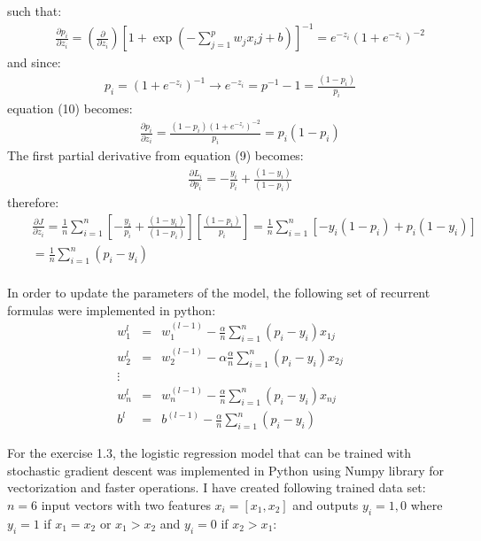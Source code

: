 \documentclass{article}
\begin{document}
such that:
\begin{eqnarray}
&&\frac{\partial{p_i}}{\partial{z_i}} = \left(\frac{\partial{}}{\partial{z_i}}\right)  \left[1+\exp(-\sum_{j=1}^{p} w_{j} x_ij +b )\right]^{-1} = e^{-z_i}(1+e^{-z_i})^{-2} 
\end{eqnarray}
and since:
\begin{eqnarray}
p_i = (1+e^{-z_i}) ^{-1} \rightarrow e^{-z_i} = p^{-1} -1 = \frac{(1-p_i)}{p_i}
\end{eqnarray}
equation (10) becomes:
\begin{eqnarray}
&&\frac{\partial{p_i}}{\partial{z_i}} =  \frac{(1-p_i)(1+e^{-z_i})^{-2} }{p_i}=p_i(1-p_i)
\end{eqnarray}
The first partial derivative from equation (9) becomes:
\begin{eqnarray}
&&\frac{\partial{L_i}}{\partial{p_i}} =  -\frac{y_i}{p_i} + \frac{(1-y_i)}{(1-p_i)}
\end{eqnarray}
therefore:
\begin{eqnarray}
&&\frac{\partial{J}}{\partial{z_i}} =  \frac{1}{n}\sum_{i=1}^{n} \left[-\frac{y_i}{p_i} + \frac{(1-y_i)}{(1-p_i)} \right] \left[  \frac{(1-p_i)}{p_i} \right] = \frac{1}{n}\sum_{i=1}^{n} [ -y_i(1-p_i) + p_i(1-y_i)] \nonumber \\ &&=  \frac{1}{n}\sum_{i=1}^{n}(p_i-y_i) \nonumber \\
\end{eqnarray}

In order to update the parameters of the model, the following set of recurrent formulas were implemented in python:
\begin{eqnarray}
w_1^{l}&=&w_{1}^{(l-1)} -  \frac{\alpha}{n}\sum_{i=1}^{n}(p_i-y_i)x_{1j}\nonumber \\
w_2^{l}&=&w_{2}^{(l-1)} - \alpha   \frac{\alpha}{n}\sum_{i=1}^{n}(p_i-y_i)x_{2j} \nonumber \\
\vdots \nonumber \\
w_n^{l}&=&w_{n}^{(l-1)} - \frac{\alpha}{n}\sum_{i=1}^{n}(p_i-y_i)x_{nj} \\
b^{l}&=&b^{(l-1)} -  \frac{\alpha}{n}\sum_{i=1}^{n}(p_i-y_i)
\end{eqnarray}

For the exercise 1.3, the logistic regression model that can be trained with stochastic gradient descent was implemented in Python using Numpy library for vectorization and faster operations. I have created following trained data set:  $n=6$ input vectors with two features $x_i=[x_1,x_2]$ and outputs $y_i={1,0}$ where $y_i=1$ if $x_1=x_2$ or $x_1>x_2$ and $y_i = 0$ if $x_2>x_1$: 
\end{document}
